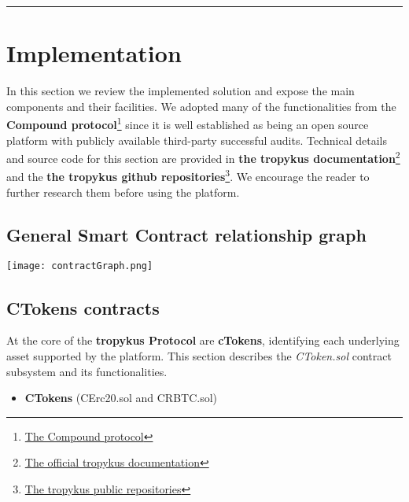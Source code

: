 \documentclass{article}
\begin{document}
\begin{center}
\noindent\rule{8cm}{0.4pt}
\end{center}

\section{Implementation}
In this section we review the implemented solution and expose the main components and their facilities. We adopted many of the functionalities from the \textbf{Compound protocol}\footnote{\href{https://github.com/compound-finance/compound-protocol}{The Compound protocol}} since it is well established as being an open source platform with publicly available third-party successful audits. Technical details and source code for this section are provided in \textbf{the tropykus documentation}\footnote{\href{https://tropykus.app/docs}{The official tropykus documentation}} and the \textbf{the tropykus github repositories}\footnote{\href{https://github.com/TruStartUp}{The tropykus public repositories}}. We encourage the reader to further research them before using the platform.

\subsection{General Smart Contract relationship graph}
\begin{center}
\texttt{[image: contractGraph.png]}
\end{center}

\subsection{CTokens contracts}
At the core of the \textbf{tropykus Protocol} are \textbf{cTokens}, identifying each underlying asset supported by the platform.
This section describes the \textit{CToken.sol} contract subsystem and its functionalities.

\begin{itemize}
\item{\textbf{CTokens}} (CErc20.sol and CRBTC.sol)
\end{itemize}
\end{document}
